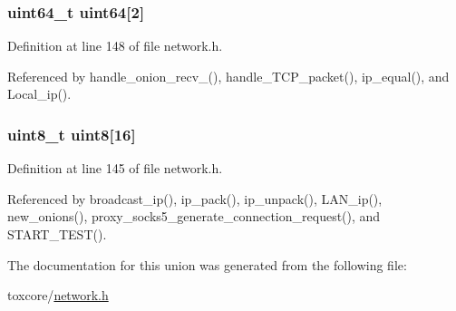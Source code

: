 \hypertarget{union_i_p6_a36c7a85cc2c5062edd5ebf13d46fa343}{
\subsubsection[{uint64}]{\setlength{\rightskip}{0pt plus 5cm}uint64\+\_\+t uint64\mbox{[}2\mbox{]}}}\label{union_i_p6_a36c7a85cc2c5062edd5ebf13d46fa343}


Definition at line 148 of file network.\+h.



Referenced by handle\+\_\+onion\+\_\+recv\+\_(), handle\+\_\+\+T\+C\+P\+\_\+packet(), ip\+\_\+equal(), and Local\+\_\+ip().

\hypertarget{union_i_p6_a6b067d428eefbf1754aa09429b1ba524}{
\subsubsection[{uint8}]{\setlength{\rightskip}{0pt plus 5cm}uint8\+\_\+t uint8\mbox{[}16\mbox{]}}}\label{union_i_p6_a6b067d428eefbf1754aa09429b1ba524}


Definition at line 145 of file network.\+h.



Referenced by broadcast\+\_\+ip(), ip\+\_\+pack(), ip\+\_\+unpack(), L\+A\+N\+\_\+ip(), new\+\_\+onions(), proxy\+\_\+socks5\+\_\+generate\+\_\+connection\+\_\+request(), and S\+T\+A\+R\+T\+\_\+\+T\+E\+S\+T().



The documentation for this union was generated from the following file\+:\begin{DoxyCompactItemize}
\item 
toxcore/\hyperlink{network_8h}{network.\+h}\end{DoxyCompactItemize}
